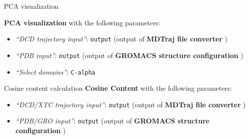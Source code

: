 \documentclass[twocolumn]{bmcart}%
\providecommand{\tightlist}{%
  \setlength{\itemsep}{0pt}\setlength{\parskip}{0pt}}
\begin{document}
\begin{handson_box_colour}{PCA visualization}

  \textbf{PCA visualization} with the following parameters:

  \begin{itemize}
  \tightlist
  \item
    \emph{``DCD trajectory input''}: \texttt{output} (output of
    \textbf{MDTraj file converter} )
  \item
    \emph{``PDB input''}: \texttt{output} (output of \textbf{GROMACS
    structure configuration} )
  \item
    \emph{``Select domains''}: \texttt{C-alpha}
  \end{itemize}



\end{handson_box_colour}
\begin{handson_box_colour}{Cosine content calculation}
  \textbf{Cosine Content} with the following parameters:

  \begin{itemize}
  \tightlist
  \item
    \emph{``DCD/XTC trajectory input''}: \texttt{output} (output of
    \textbf{MDTraj file converter} )
  \item
    \emph{``PDB/GRO input''}: \texttt{output} (output of \textbf{GROMACS
    structure configuration} )
  \end{itemize}



\end{handson_box_colour}
\end{document}
